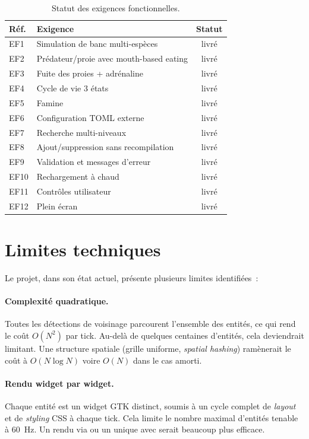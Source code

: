 \begin{table}[h!]
\centering
\footnotesize
\begin{tabular}{@{}llc@{}}
\toprule
\textbf{Réf.} & \textbf{Exigence} & \textbf{Statut} \\
\midrule
EF1  & Simulation de banc multi-espèces       & livré \\
EF2  & Prédateur/proie avec mouth-based eating & livré \\
EF3  & Fuite des proies + adrénaline          & livré \\
EF4  & Cycle de vie 3 états                    & livré \\
EF5  & Famine                                  & livré \\
EF6  & Configuration TOML externe              & livré \\
EF7  & Recherche multi-niveaux                 & livré \\
EF8  & Ajout/suppression sans recompilation    & livré \\
EF9  & Validation et messages d'erreur         & livré \\
EF10 & Rechargement à chaud                    & livré \\
EF11 & Contrôles utilisateur                   & livré \\
EF12 & Plein écran                             & livré \\
\bottomrule
\end{tabular}
\caption{Statut des exigences fonctionnelles.}
\label{tab:bilan}
\end{table}

\section{Limites techniques}

Le projet, dans son état actuel, présente plusieurs limites
identifiées~:

\paragraph{Complexité quadratique.} Toutes les détections de
voisinage parcourent l'ensemble des entités, ce qui rend le coût
$O(N^2)$ par tick. Au-delà de quelques centaines d'entités, cela
deviendrait limitant. Une structure spatiale (grille uniforme,
\emph{spatial hashing}) ramènerait le coût à $O(N \log N)$ voire
$O(N)$ dans le cas amorti.

\paragraph{Rendu widget par widget.} Chaque entité est un widget
GTK distinct, soumis à un cycle complet de \emph{layout} et de
\emph{styling} CSS à chaque tick. Cela limite le nombre maximal
d'entités tenable à 60~Hz. Un rendu via  ou un
 unique avec  serait beaucoup
plus efficace.

